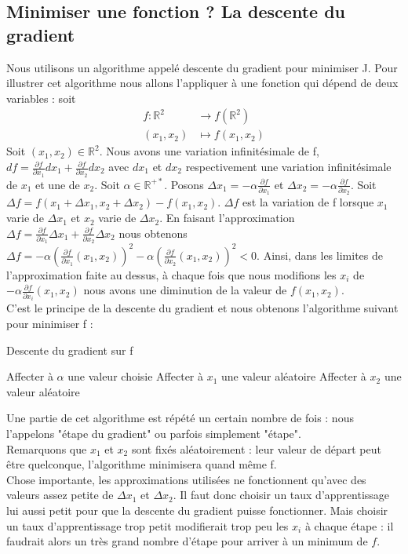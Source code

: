 \documentclass[a4paper,10pt]{article}
\begin{document}
\subsection{Minimiser une fonction ? La descente du gradient}
Nous utilisons un algorithme appelé descente du gradient pour minimiser J. Pour illustrer cet algorithme nous allons l'appliquer à une fonction qui dépend de deux variables : soit
\begin{align*}
f\colon \mathbb{R}^2&\longrightarrow f(\mathbb{R}^2)\\
(x_1, x_2)&\longmapsto f(x_1, x_2)
\end{align*}
Soit $(x_1, x_2) \in \mathbb{R}^2$. Nous avons une variation infinitésimale de f, $df = \frac{\partial f}{\partial x_{1}}d x_{1} + \frac{\partial f}{\partial x_{2}}dx_{2}$ avec $dx_1$ et $dx_2$ respectivement une variation infinitésimale de $x_1$ et une de $x_2$. 
Soit $\alpha \in \mathbb{R}^{+*}$. 
 Posons $\Delta x_{1} = -\alpha \frac{\partial f}{\partial x_{1}}$
 et $\Delta x_{2} = -\alpha \frac{\partial f}{\partial x_{2}}$. Soit $\Delta f = f(x_1 + \Delta x_1, x_2 + \Delta x_2) - f(x_1, x_2)$. $\Delta f$ est la variation de f lorsque $x_1$ varie de $\Delta x_1$ et $x_2$ varie de $\Delta x_2$. 
En faisant l'approximation $\Delta f = \frac{\partial f}{\partial x_{1}}\Delta  x_{1} + \frac{\partial f}{\partial x_{2}}\Delta x_{2}$ nous obtenons $\Delta f = -\alpha (\frac{\partial f}{\partial x_{1}}(x_1, x_2))^{2} - \alpha (\frac{\partial f}{\partial x_{2}}(x_1, x_2))^{2} < 0$. Ainsi, dans
 les limites de l'approximation faite au dessus, à chaque fois que nous modifions les $x_{i}$ de $- \alpha \frac{\partial f}{\partial x_{i}}(x_1, x_2)$
 nous avons une diminution de la valeur de $f(x_1, x_2)$.\\

C'est le principe de la descente du gradient et nous obtenons l'algorithme suivant pour minimiser f :
\begin{algorithm}
\caption{Descente du gradient sur f}
Affecter à $\alpha$ une valeur choisie\;
Affecter à $x_1$ une valeur aléatoire\;
Affecter à $x_2$ une valeur aléatoire\;
\end{algorithm}

\noindent Une partie de cet algorithme est répété un certain nombre de fois : nous l'appelons "étape du gradient" ou parfois simplement "étape".\\
Remarquons que $x_1$ et $x_2$ sont fixés aléatoirement : leur valeur de départ peut être quelconque, l'algorithme minimisera quand même f.\\
Chose importante, les approximations utilisées ne fonctionnent qu'avec des valeurs assez petite de $\Delta x_1$ et $\Delta x_2$. Il faut donc choisir un taux d'apprentissage lui aussi petit pour que la descente du gradient puisse fonctionner. Mais choisir un taux d'apprentissage trop petit modifierait trop peu les $x_i$ à chaque étape : il faudrait alors un très grand nombre d'étape pour arriver à un minimum de $f$.\\
\end{document}
